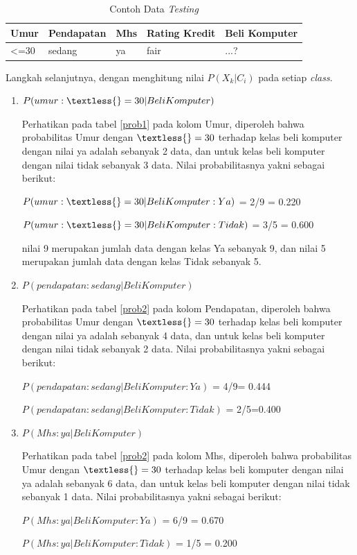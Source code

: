 \begin{table}[!ht]
\centering
\caption{Contoh Data \textit{Testing}}
\label{testing}
\begin{tabular}{|l|l|l|l|l|}
\hline
Umur           & Pendapatan & Mhs & Rating Kredit & Beli Komputer \\ \hline
\textless{}=30 & sedang     & ya  & fair          & ...?          \\ \hline
\end{tabular}
\end{table}
\par Langkah selanjutnya, dengan menghitung nilai $P(X_{k}|C_{i})$ pada setiap \textit{class}.

\begin{enumerate}
    \item $P(umur :\textless{}=30|Beli Komputer)$
    \par Perhatikan pada tabel \ref{prob1} pada kolom Umur, diperoleh bahwa probabilitas Umur dengan $\textless{}=30$ terhadap kelas beli komputer dengan nilai ya adalah sebanyak 2 data, dan untuk kelas beli komputer dengan nilai tidak sebanyak 3 data. Nilai probabilitasnya yakni sebagai berikut:
\par $P(umur :\textless{}=30|Beli Komputer:Ya)$ = 2/9 = 0.220
\par $P(umur :\textless{}=30|Beli Komputer:Tidak)$ = 3/5 = 0.600
\par nilai 9 merupakan jumlah data dengan kelas Ya sebanyak 9, dan nilai 5 merupakan jumlah data dengan kelas Tidak sebanyak 5.
\item $P(pendapatan :sedang|Beli Komputer)$
\par Perhatikan pada tabel \ref{prob2} pada kolom Pendapatan, diperoleh bahwa probabilitas Umur dengan $\textless{}=30$ terhadap kelas beli komputer dengan nilai ya adalah sebanyak 4 data, dan untuk kelas beli komputer dengan nilai tidak sebanyak 2 data. Nilai probabilitasnya yakni sebagai berikut:
\par $P(pendapatan :sedang|Beli Komputer:Ya)$ = 4/9= 0.444
\par $P(pendapatan :sedang|Beli Komputer:Tidak)$ = 2/5=0.400

\item $P(Mhs:ya|Beli Komputer)$
\par Perhatikan pada tabel \ref{prob2} pada kolom Mhs, diperoleh bahwa probabilitas Umur dengan $\textless{}=30$ terhadap kelas beli komputer dengan nilai ya adalah sebanyak 6 data, dan untuk kelas beli komputer dengan nilai tidak sebanyak 1 data. Nilai probabilitasnya yakni sebagai berikut:
\par $P(Mhs:ya|Beli Komputer:Ya)$ = 6/9 =  0.670 
\par $P(Mhs:ya|Beli Komputer:Tidak)$ = 1/5	 =  0.200


\end{enumerate}
